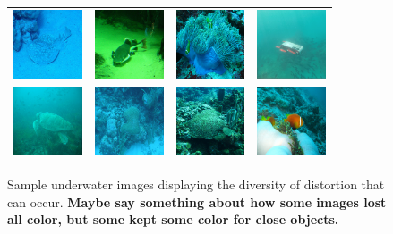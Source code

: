 \documentclass[conference,reqno]{IEEEtran}
\begin{document}
\begin{figure}
\centering
\begin{tabular}{p{1.7cm} p{1.7cm} p{1.7cm} p{1.7cm}}
   
   \includegraphics[width=0.8in]{n01496331_7428_f1} &
   \includegraphics[width=0.8in]{n01496331_16340_f1} &
   \includegraphics[width=0.8in]{n01914609_5148_f1} &
   \includegraphics[width=0.8in]{robot_f1} \\
   \includegraphics[width=0.8in]{n01664065_30279_f1} &
   \includegraphics[width=0.8in]{n01917289_5711_f1} &
   \includegraphics[width=0.8in]{n01917289_4087_f1} &
   \includegraphics[width=0.8in]{n02607072_10395_f1} \\

\end{tabular}
\caption{Sample underwater images displaying the diversity of distortion that can occur. \textbf{Maybe say something about how
some images lost all color, but some kept some color for close objects.}}
\end{figure}
\end{document}
